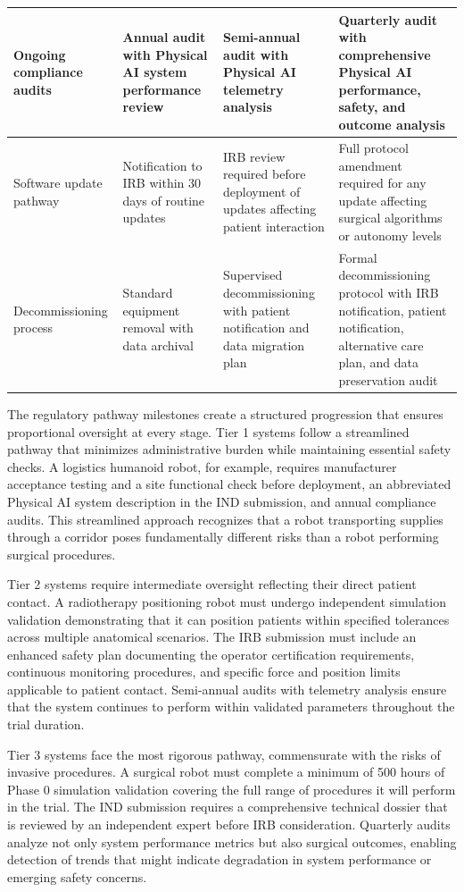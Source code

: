 \begin{table}[H]
\begin{tabularx}{\textwidth}{p{3.25cm} X X X}
\midrule
Ongoing compliance audits & Annual audit with Physical AI system performance review & Semi-annual audit with Physical AI telemetry analysis & Quarterly audit with comprehensive Physical AI performance, safety, and outcome analysis \\
\midrule
Software update pathway & Notification to IRB within 30 days of routine updates & IRB review required before deployment of updates affecting patient interaction & Full protocol amendment required for any update affecting surgical algorithms or autonomy levels \\
\midrule
Decommissioning process & Standard equipment removal with data archival & Supervised decommissioning with patient notification and data migration plan & Formal decommissioning protocol with IRB notification, patient notification, alternative care plan, and data preservation audit \\
\bottomrule
\end{tabularx}
\end{table}

The regulatory pathway milestones create a structured progression that ensures
proportional oversight at every stage. Tier 1 systems follow a streamlined
pathway that minimizes administrative burden while maintaining essential safety
checks. A logistics humanoid robot, for example, requires manufacturer
acceptance testing and a site functional check before deployment, an
abbreviated Physical AI system description in the IND submission, and annual
compliance audits. This streamlined approach recognizes that a robot
transporting supplies through a corridor poses fundamentally different risks
than a robot performing surgical procedures.

Tier 2 systems require intermediate oversight reflecting their direct patient
contact. A radiotherapy positioning robot must undergo independent simulation
validation demonstrating that it can position patients within specified
tolerances across multiple anatomical scenarios. The IRB submission must
include an enhanced safety plan documenting the operator certification
requirements, continuous monitoring procedures, and specific force and position
limits applicable to patient contact. Semi-annual audits with telemetry
analysis ensure that the system continues to perform within validated parameters
throughout the trial duration.

Tier 3 systems face the most rigorous pathway, commensurate with the risks of
invasive procedures. A surgical robot must complete a minimum of 500 hours of
Phase 0 simulation validation covering the full range of procedures it will
perform in the trial. The IND submission requires a comprehensive technical
dossier that is reviewed by an independent expert before IRB consideration.
Quarterly audits analyze not only system performance metrics but also surgical
outcomes, enabling detection of trends that might indicate degradation in
system performance or emerging safety concerns.

